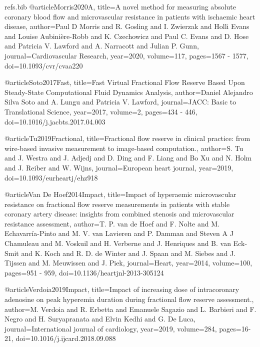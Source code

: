 \begin{filecontents}{refs.bib}
@article{Morris2020A,
title={A novel method for measuring absolute coronary blood flow and microvascular resistance in patients with ischaemic heart disease},
author={Paul D Morris and R. Gosling and I. Zwierzak and Holli Evans and Louise Aubinière-Robb and K. Czechowicz and Paul C. Evans and D. Hose and Patricia V. Lawford and A. Narracott and Julian P. Gunn},
journal={Cardiovascular Research},
year={2020},
volume={117},
pages={1567 - 1577},
doi={10.1093/cvr/cvaa220}
}

@article{Soto2017Fast,
title={Fast Virtual Fractional Flow Reserve Based Upon Steady-State Computational Fluid Dynamics Analysis},
author={Daniel Alejandro Silva Soto and A. Lungu and Patricia V. Lawford},
journal={JACC: Basic to Translational Science},
year={2017},
volume={2},
pages={434 - 446},
doi={10.1016/j.jacbts.2017.04.003}
}

@article{Tu2019Fractional,
title={Fractional flow reserve in clinical practice: from wire-based invasive measurement to image-based computation.},
author={S. Tu and J. Westra and J. Adjedj and D. Ding and F. Liang and Bo Xu and N. Holm and J. Reiber and W. Wijns},
journal={European heart journal},
year={2019},
doi={10.1093/eurheartj/ehz918}
}

@article{Van De Hoef2014Impact,
title={Impact of hyperaemic microvascular resistance on fractional flow reserve measurements in patients with stable coronary artery disease: insights from combined stenosis and microvascular resistance assessment},
author={T. P. van de Hoef and F. Nolte and M. Echavarría-Pinto and M. V. van Lavieren and P. Damman and Steven A J Chamuleau and M. Voskuil and H. Verberne and J. Henriques and B. van Eck-Smit and K. Koch and R. D. de Winter and J. Spaan and M. Siebes and J. Tijssen and M. Meuwissen and J. Piek},
journal={Heart},
year={2014},
volume={100},
pages={951 - 959},
doi={10.1136/heartjnl-2013-305124}
}

@article{Verdoia2019Impact,
title={Impact of increasing dose of intracoronary adenosine on peak hyperemia duration during fractional flow reserve assessment.},
author={M. Verdoia and R. Erbetta and Emanuele Sagazio and L. Barbieri and F. Negro and H. Suryapranata and Elvin Kedhi and G. De Luca},
journal={International journal of cardiology},
year={2019},
volume={284},
pages={16-21},
doi={10.1016/j.ijcard.2018.09.088}
}
\end{filecontents}

\documentclass{article}
\usepackage{adjustbox}


\subsection*{Key points from the literature}


